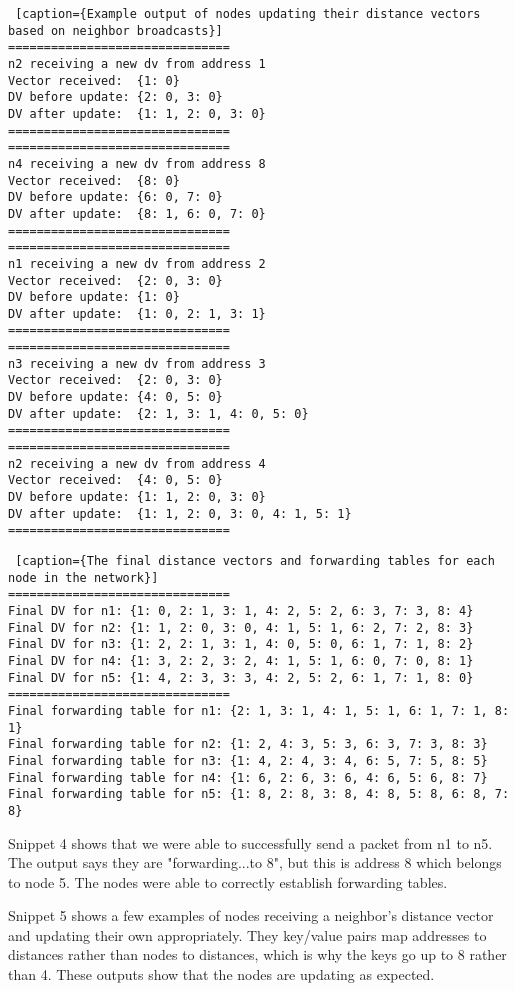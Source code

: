 \documentclass[11pt]{article}
\begin{document}
 \begin{lstlisting} [caption={Example output of nodes updating their distance vectors based on neighbor broadcasts}]
===============================
n2 receiving a new dv from address 1
Vector received:  {1: 0}
DV before update: {2: 0, 3: 0}
DV after update:  {1: 1, 2: 0, 3: 0}
===============================
===============================
n4 receiving a new dv from address 8
Vector received:  {8: 0}
DV before update: {6: 0, 7: 0}
DV after update:  {8: 1, 6: 0, 7: 0}
===============================
===============================
n1 receiving a new dv from address 2
Vector received:  {2: 0, 3: 0}
DV before update: {1: 0}
DV after update:  {1: 0, 2: 1, 3: 1}
===============================
===============================
n3 receiving a new dv from address 3
Vector received:  {2: 0, 3: 0}
DV before update: {4: 0, 5: 0}
DV after update:  {2: 1, 3: 1, 4: 0, 5: 0}
===============================
===============================
n2 receiving a new dv from address 4
Vector received:  {4: 0, 5: 0}
DV before update: {1: 1, 2: 0, 3: 0}
DV after update:  {1: 1, 2: 0, 3: 0, 4: 1, 5: 1}
===============================
\end{lstlisting}

 \begin{lstlisting} [caption={The final distance vectors and forwarding tables for each node in the network}]
===============================
Final DV for n1: {1: 0, 2: 1, 3: 1, 4: 2, 5: 2, 6: 3, 7: 3, 8: 4}
Final DV for n2: {1: 1, 2: 0, 3: 0, 4: 1, 5: 1, 6: 2, 7: 2, 8: 3}
Final DV for n3: {1: 2, 2: 1, 3: 1, 4: 0, 5: 0, 6: 1, 7: 1, 8: 2}
Final DV for n4: {1: 3, 2: 2, 3: 2, 4: 1, 5: 1, 6: 0, 7: 0, 8: 1}
Final DV for n5: {1: 4, 2: 3, 3: 3, 4: 2, 5: 2, 6: 1, 7: 1, 8: 0}
===============================
Final forwarding table for n1: {2: 1, 3: 1, 4: 1, 5: 1, 6: 1, 7: 1, 8: 1}
Final forwarding table for n2: {1: 2, 4: 3, 5: 3, 6: 3, 7: 3, 8: 3}
Final forwarding table for n3: {1: 4, 2: 4, 3: 4, 6: 5, 7: 5, 8: 5}
Final forwarding table for n4: {1: 6, 2: 6, 3: 6, 4: 6, 5: 6, 8: 7}
Final forwarding table for n5: {1: 8, 2: 8, 3: 8, 4: 8, 5: 8, 6: 8, 7: 8}
\end{lstlisting}

Snippet 4 shows that we were able to successfully send a packet from n1 to n5. The output says they are "forwarding...to 8", but this is address 8 which belongs to node 5. The nodes were able to correctly establish forwarding tables.

Snippet 5 shows a few examples of nodes receiving a neighbor's distance vector and updating their own appropriately. They key/value pairs map addresses to distances rather than nodes to distances, which is why the keys go up to 8 rather than 4. These outputs show that the nodes are updating as expected.
\end{document}

